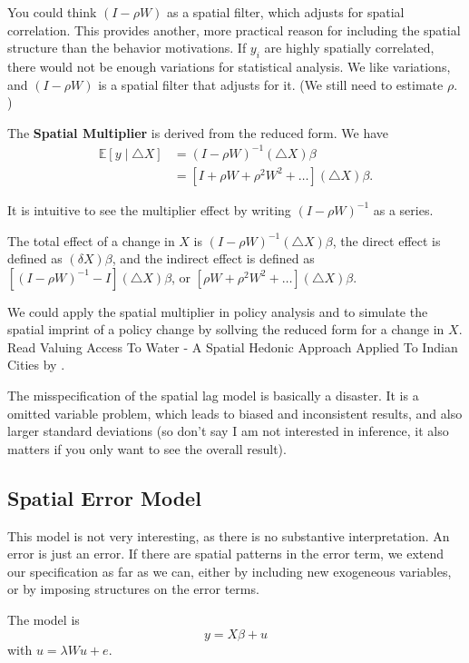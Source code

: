 \documentclass[11pt,a4paper]{amsart}
\theoremstyle{plain}
\theoremstyle{definition}
\begin{document}
You could think $(I-\rho W)$ as a spatial filter, which adjusts for spatial correlation. This provides another, more practical reason for including the spatial structure than the behavior motivations. If $y_{i}$ are highly spatially correlated, there would not be enough variations for statistical analysis. We like variations, and $(I-\rho W)$ is a spatial filter that adjusts for it. (We still need to estimate $\rho$. )

The \textbf{Spatial Multiplier} is derived from the reduced form. We have 
\[	\begin{aligned}
	\mathbb{E}[y \mid \triangle X] &= (I-\rho W)^{-1}(\triangle X)\beta \\
	&= [I + \rho W + \rho^{2}W^{2} + \dots ] (\triangle X) \beta. 
\end{aligned}	\]

It is intuitive to see the multiplier effect by writing $(I-\rho W)^{-1}$ as a series. 

The total effect of a change in $X$ is $ (I-\rho W)^{-1}(\triangle X)\beta$, the direct effect is defined as $(\delta X) \beta$, and the indirect effect is defined as $[(I-\rho W)^{-1} - I](\triangle X) \beta$, or $[\rho W + \rho^{2}W^{2} + \dots ] (\triangle X) \beta$.

We could apply the spatial multiplier in policy analysis and to simulate the spatial imprint of a policy change by sollving the reduced form for a change in $X$. Read Valuing Access To Water - A Spatial Hedonic Approach Applied To Indian Cities by \textcite{anselinValuingAccessWater2008}.

The misspecification of the spatial lag model is basically a disaster. It is a omitted variable problem, which leads to biased and inconsistent results, and also larger standard deviations (so don't say I am not interested in inference, it also matters if you only want to see the overall result). 

\subsection{Spatial Error Model}
This model is not very interesting, as there is no substantive interpretation. An error is just an error. If there are spatial patterns in the error term, we extend our specification as far as we can, either by including new exogeneous variables, or by imposing structures on the error terms. 

The model is 
\[	y = X\beta + u	\]
with $u = \lambda Wu + e$.
\end{document}
